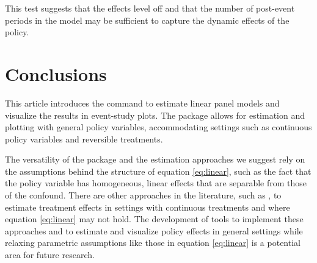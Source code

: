 \documentclass[12pt]{article}
\begin{document}
\begin{stlog}
	\nullskip
\end{stlog}

This test suggests that the effects level off and that the number of post-event periods in the model may be sufficient to capture the dynamic effects of the policy.

\section{Conclusions}

This article introduces the \xtevent command to estimate linear panel models and visualize the results in event-study plots.
The package allows for estimation and plotting with general policy variables, accommodating settings such as continuous policy variables and reversible treatments.

The versatility of the package and the estimation approaches we suggest rely on the assumptions behind the structure of equation \eqref{eq:linear}, such as the fact that the policy variable has homogeneous, linear effects that are separable from those of the confound.
There are other approaches in the literature, such as \cite{Callaway2024}, to estimate treatment effects in settings with continuous treatments and where equation \eqref{eq:linear} may not hold.
The development of tools to implement these approaches and to estimate and visualize policy effects in general settings while relaxing parametric assumptions like those in equation \eqref{eq:linear} is a potential area for future research.


%
%







\end{document}
